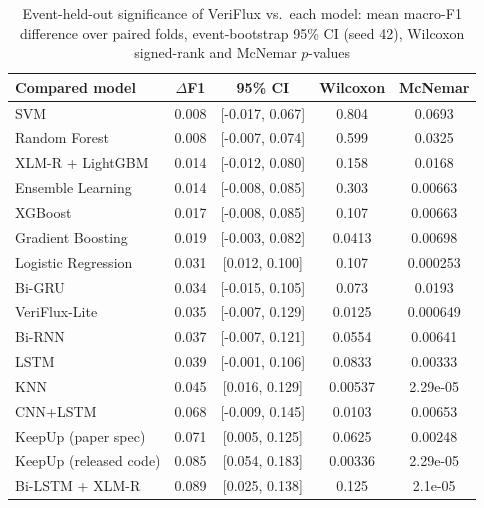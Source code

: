 \begin{table}[t]
\centering
\caption{Event-held-out significance of VeriFlux vs.\ each model: mean macro-F1 difference over paired folds,
event-bootstrap 95\% CI (seed 42), Wilcoxon signed-rank and McNemar $p$-values}
\label{tab:sig}
\scriptsize
\begin{tabular}{lcccc}
\toprule
Compared model & $\Delta$F1 & 95\% CI & Wilcoxon & McNemar\\
\midrule
SVM & 0.008 & [-0.017, 0.067] & 0.804 & 0.0693\\
Random Forest & 0.008 & [-0.007, 0.074] & 0.599 & 0.0325\\
XLM-R + LightGBM & 0.014 & [-0.012, 0.080] & 0.158 & 0.0168\\
Ensemble Learning & 0.014 & [-0.008, 0.085] & 0.303 & 0.00663\\
XGBoost & 0.017 & [-0.008, 0.085] & 0.107 & 0.00663\\
Gradient Boosting & 0.019 & [-0.003, 0.082] & 0.0413 & 0.00698\\
Logistic Regression & 0.031 & [0.012, 0.100] & 0.107 & 0.000253\\
Bi-GRU & 0.034 & [-0.015, 0.105] & 0.073 & 0.0193\\
VeriFlux-Lite & 0.035 & [-0.007, 0.129] & 0.0125 & 0.000649\\
Bi-RNN & 0.037 & [-0.007, 0.121] & 0.0554 & 0.00641\\
LSTM & 0.039 & [-0.001, 0.106] & 0.0833 & 0.00333\\
KNN & 0.045 & [0.016, 0.129] & 0.00537 & 2.29e-05\\
CNN+LSTM & 0.068 & [-0.009, 0.145] & 0.0103 & 0.00653\\
KeepUp (paper spec) & 0.071 & [0.005, 0.125] & 0.0625 & 0.00248\\
KeepUp (released code) & 0.085 & [0.054, 0.183] & 0.00336 & 2.29e-05\\
Bi-LSTM + XLM-R & 0.089 & [0.025, 0.138] & 0.125 & 2.1e-05\\
\bottomrule
\end{tabular}
\end{table}
